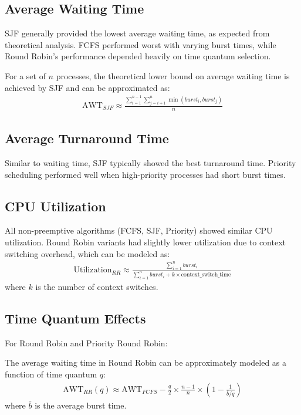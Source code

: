 \documentclass[12pt,a4paper]{report}
\begin{document}
\subsection{Average Waiting Time}
SJF generally provided the lowest average waiting time, as expected from theoretical analysis. FCFS performed worst with varying burst times, while Round Robin's performance depended heavily on time quantum selection.

For a set of $n$ processes, the theoretical lower bound on average waiting time is achieved by SJF and can be approximated as:
\begin{align}
\text{AWT}_{SJF} \approx \frac{\sum_{i=1}^{n-1} \sum_{j=i+1}^{n} \min(burst_i, burst_j)}{n}
\end{align}

\subsection{Average Turnaround Time}
Similar to waiting time, SJF typically showed the best turnaround time. Priority scheduling performed well when high-priority processes had short burst times.

\subsection{CPU Utilization}
All non-preemptive algorithms (FCFS, SJF, Priority) showed similar CPU utilization. Round Robin variants had slightly lower utilization due to context switching overhead, which can be modeled as:
\begin{align}
\text{Utilization}_{RR} \approx \frac{\sum_{i=1}^{n} burst_i}{\sum_{i=1}^{n} burst_i + k \times \text{context\_switch\_time}}
\end{align}
where $k$ is the number of context switches.

\subsection{Time Quantum Effects}
For Round Robin and Priority Round Robin:

The average waiting time in Round Robin can be approximately modeled as a function of time quantum $q$:
\begin{align}
\text{AWT}_{RR}(q) \approx \text{AWT}_{FCFS} - \frac{q}{2} \times \frac{n-1}{n} \times (1 - \frac{1}{\bar{b}/q})
\end{align}
where $\bar{b}$ is the average burst time.
\end{document}
